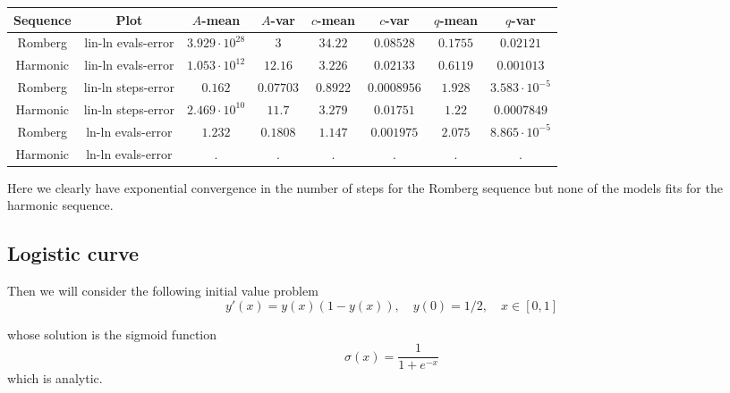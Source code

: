 \begin{table}[H]
    \centering
    \small
    \begin{tabular}{c|c||c|c|c|c|c|c}
Sequence & Plot & \(A\)-mean & \(A\)-var & \(c\)-mean & \(c\)-var & \(q\)-mean & \(q\)-var\\\hline
Romberg & lin-ln evals-error & \(3.929\cdot 10^{28}\) & \(3\) & \(34.22\) & \(0.08528\) & \(0.1755\) & \(0.02121\) \\
Harmonic & lin-ln evals-error & \(1.053\cdot 10^{12}\) & \(12.16\) & \(3.226\) & \(0.02133\) & \(0.6119\) & \(0.001013\) \\
Romberg & lin-ln steps-error & \(0.162\) & \(0.07703\) & \(0.8922\) & \(0.0008956\) & \(1.928\) & \(3.583\cdot 10^{-5}\) \\
Harmonic & lin-ln steps-error & \(2.469\cdot 10^{10}\) & \(11.7\) & \(3.279\) & \(0.01751\) & \(1.22\) & \(0.0007849\) \\
Romberg & ln-ln evals-error & \(1.232\) & \(0.1808\) & \(1.147\) & \(0.001975\) & \(2.075\) & \(8.865\cdot 10^{-5}\) \\
Harmonic & ln-ln evals-error & . & . & . & . & . & . \\
    \end{tabular}
    \label{tab:my_label}
\end{table}

Here we clearly have exponential convergence in the number of steps for the Romberg sequence but none of the models fits for the harmonic sequence.

\subsection{Logistic curve}

Then we will consider the following initial value problem
\begin{equation}\label{43}
y'(x) = y(x)(1-y(x)),\quad y(0) = 1/2, \quad x\in [0,1]
\end{equation}

whose solution is the sigmoid function
\[
\sigma(x) = \frac{1}{1 + e^{-x}}
\]
which is analytic.

